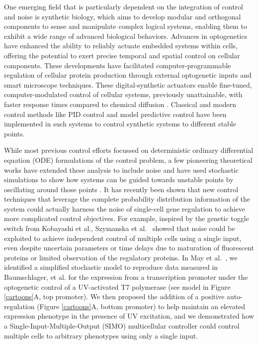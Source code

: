 \documentclass[12pt]{iopart}
\begin{document}
One emerging field that is particularly dependent on the integration of control and noise is synthetic biology, which aims to develop modular\cite{Ng2019} and orthogonal \cite{Liu2018} components to sense and manipulate \cite{Sheets2020} complex logical systems, enabling them to exhibit a wide range of advanced biological behaviors\cite{Shin2020}. 
Advances in optogenetics have enhanced the ability to reliably actuate embedded systems within cells, offering the potential to exert precise temporal and spatial control on cellular components\cite{Sheets2020,Baumschlager2017,Chen2020,Lillacci2018}.
These developments have facilitated computer-programmable regulation of cellular protein production through external optogenetic inputs and smart microscope techniques\cite{Fox2021,Baumschlager2021,Lugagne2017}. 
These digital-synthetic actuators enable fine-tuned, computer-modulated control of cellular systems, previously unattainable, with faster response times compared to chemical diffusion\cite{Rullan2018, Baumschlager2017} . 
Classical and modern control methods like PID control and model predictive control have been implemented in such systems  to control synthetic systems to different stable points. 

While most previous control efforts focussed on deterministic ordinary differential equation (ODE) formulations of the control problem, a few pioneering theoretical works have extended these analysis to include noise and have used stochastic simulations to show how systems can be guided towards unstable points by oscillating around those points \cite{Guarino2020}. 
It has recently been shown that new control techniques that leverage the complete probability distribution information of the system could actually harness the noise of single-cell gene regulation to achieve more complicated control objectives. 
For example, inspired by the genetic toggle switch from Kobayashi et al.\cite{Kobayashi:2004}, Szymanska et al.~\cite{Szymanska2015} showed that noise could be exploited to achieve independent control of multiple cells using a single input, even despite uncertain parameters or time delays due to maturation of fluorescent proteins or limited observation of the regulatory proteins. 
In May et al.~\cite{May2021}, we identified a simplified stochastic model to reproduce data measured in Baumschlager, et al.  for the expression from a transcription promoter under the optogenetic control of a UV-activated T7 polymerase (see model in Figure \ref{cartoons}A, top promoter).
We then proposed the addition of a positive auto-regulation (Figure \ref{cartoons}A, bottom promoter) to help maintain an elevated expression phenotype in the presence of UV excitation, and we demonstrated how a Single-Input-Multiple-Output (SIMO) multicellular controller could control multiple cells to arbitrary phenotypes using only a single input. 
\end{document}

